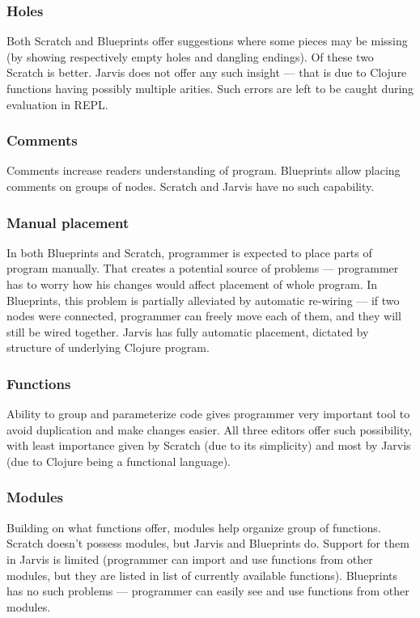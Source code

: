 \documentclass[11pt]{scrartcl}
\begin{document}
\subsubsection*{Holes}
Both Scratch and Blueprints offer suggestions where some pieces may be missing
(by showing respectively empty holes and dangling endings). Of these two Scratch
is better. Jarvis does not offer any such insight --- that is due to Clojure
functions having possibly multiple arities. Such errors are left to be caught
during evaluation in REPL.

\subsubsection*{Comments}
Comments increase readers understanding of program. Blueprints allow placing
comments on groups of nodes. Scratch and Jarvis have no such capability.

\subsubsection*{Manual placement}
In both Blueprints and Scratch, programmer is expected to place parts of
program manually. That creates a potential source of problems --- programmer has
to worry how his changes would affect placement of whole program. In Blueprints,
this problem is partially alleviated by automatic re-wiring --- if two nodes
were connected, programmer can freely move each of them, and they will still be
wired together. Jarvis has fully automatic placement, dictated by structure of
underlying Clojure program. 

\subsubsection*{Functions}
Ability to group and parameterize code gives programmer very important tool to
avoid duplication and make changes easier. All three editors offer such
possibility, with least importance given by Scratch (due to its simplicity) and
most by Jarvis (due to Clojure being a functional language).

\subsubsection*{Modules}
Building on what functions offer, modules help organize group of functions.
Scratch doesn't possess modules, but Jarvis and Blueprints do. Support for them
in Jarvis is limited (programmer can import and use functions from other
modules, but they are listed in list of currently available functions).
Blueprints has no such problems --- programmer can easily see and use functions
from other modules.
\end{document}
